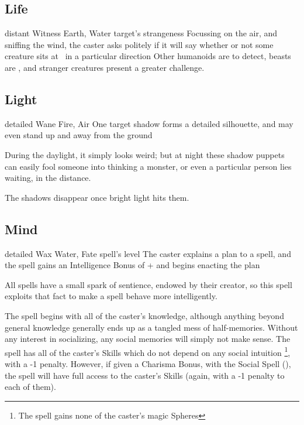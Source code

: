 \begin{multicols}{2}
\subsection{Life}


  {distant}%
  {Witness}%
  {Earth, Water}%
  {target's strangeness}%
  {Focussing on the air, and sniffing the wind, the caster asks politely if it will say whether or not some creature sits at \spellRange\ in a particular direction}%
  {Other humanoids are \tn[7] to detect, beasts are \tn[9], and stranger creatures present a greater challenge.}


\subsection{Light}



  {detailed}%
  {Wane}%
  {Fire, Air}%
  {}%
  {One target shadow forms a detailed silhouette, and may even stand up and away from the ground}%
  {During the daylight, it simply looks weird; but at night these shadow puppets can easily fool someone into thinking a monster, or even a particular person lies waiting, in the distance.

  The shadows disappear once bright light hits them.}

\subsection{Mind}

  {detailed}%
  {Wax}%
  {Water, Fate}%
  {spell's level}%
  {The caster explains a plan to a spell, and the spell gains an Intelligence Bonus of + and begins enacting the plan}%
  {
  All spells have a small spark of sentience, endowed by their creator, so this spell exploits that fact to make a spell behave more intelligently.

  The spell begins with all of the caster's knowledge, although anything beyond general knowledge generally ends up as a tangled mess of half-memories.
  Without any interest in socializing, any social memories will simply not make sense.
  The spell has all of the caster's Skills which do not depend on any social intuition%
  \footnote{The spell gains none of the caster's magic Spheres},
  with a -1 penalty.
  However, if given a Charisma Bonus, with the Social Spell (), the spell will have full access to the caster's Skills (again, with a -1 penalty to each of them).

}
\end{multicols}
